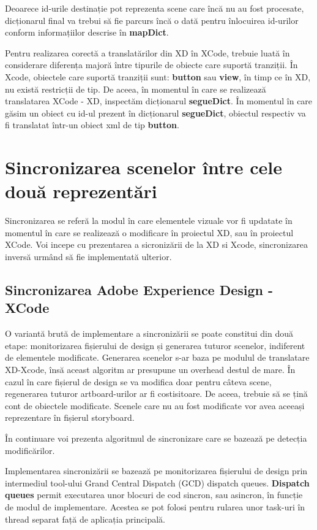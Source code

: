 Deoarece id-urile destinație pot reprezenta scene care încă nu au fost procesate, dicționarul final va trebui să fie parcurs încă o dată pentru înlocuirea id-urilor conform informațiilor descrise în \textbf{mapDict}.

Pentru realizarea corectă a translatărilor din XD în XCode, trebuie luată în considerare diferența majoră între tipurile de obiecte care suportă tranziții. În Xcode, obiectele care suportă tranziții sunt: \textbf{button} sau \textbf{view}, în timp ce în XD, nu există restricții de tip. De aceea, în momentul în care se realizează translatarea XCode - XD, inspectăm dicționarul \textbf{segueDict}. În momentul în care găsim un obiect cu id-ul prezent în dicționarul  \textbf{segueDict}, obiectul respectiv va fi translatat într-un obiect xml de tip \textbf{button}.

\section{Sincronizarea scenelor între cele două reprezentări}

Sincronizarea se referă la modul în care elementele vizuale vor fi updatate în momentul în care se realizează o modificare în proiectul XD, sau în proiectul XCode.
Voi incepe cu prezentarea a sicronizării de la XD si Xcode, sincronizarea inversă urmând să fie implementată ulterior.

\subsection{Sincronizarea Adobe Experience Design - XCode}

O variantă brută de implementare a sincronizării se poate constitui din două etape: monitorizarea fișierului de design și generarea tuturor scenelor, indiferent de elementele modificate. Generarea scenelor s-ar baza pe modulul de translatare XD-Xcode, însă aceast algoritm ar presupune un overhead destul de mare. În cazul în care fișierul de design se va modifica doar pentru câteva scene, regenerarea tuturor artboard-urilor ar fi costisitoare. De aceea, trebuie să se țină cont de obiectele modificate. Scenele care nu au fost modificate vor avea aceeași reprezentare în fișierul storyboard.

În continuare voi prezenta algoritmul de sincronizare care se bazează pe detecția modificărilor.

Implementarea sincronizării se bazează pe monitorizarea fișierului de design prin intermediul tool-ului Grand Central Dispatch (GCD) dispatch queues. \textbf{Dispatch queues} permit executarea unor blocuri de cod sincron, sau asincron, în funcție de modul de implementare. Acestea se pot folosi pentru rularea unor task-uri în thread separat față de aplicația principală. 

